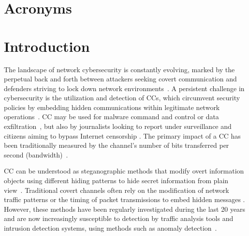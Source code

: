 \documentclass[journal]{IEEEtran}
\begin{document}
\section*{Acronyms}
\begin{acronym}[1200pt]
\setlength{\itemsep}{-3pt}
\end{acronym}

\section{Introduction}
The landscape of network cybersecurity is constantly evolving, marked by the perpetual back and forth between attackers seeking covert communication and defenders striving to lock down network environments~\cite{NIHBook}. A persistent challenge in cybersecurity is the utilization and detection of \ac{CC}s, which circumvent security policies by embedding hidden communications within legitimate network operations~\cite{petitcolas1999information,Schmid23,zander2007survey}. \ac{CC} may be used for malware command and control or data exfiltration~\cite{NIHBook,caviglione2022never,zander2007survey}, but also by journalists looking to report under surveillance \cite{wustrow2011telex,fifield2012evading} and citizens aiming to bypass Internet censorship \cite{AsiaCCS24:OPPR}. The primary impact of a \ac{CC} has been traditionally measured by the channel's number of bits transferred per second (bandwidth)~\cite{twenty02}.

\ac{CC} can be understood as steganographic methods that modify overt information objects using different hiding patterns to hide secret information from plain view~\cite{NIHBook,zander2007survey}. Traditional covert channels often rely on the modification of network traffic patterns or the timing of packet transmissions to embed hidden messages \cite{mileva14,wendzelpatternsurvey15}. However, these methods have been regularly investigated during the last 20 years and are now increasingly susceptible to detection by traffic analysis tools and intrusion detection systems, using methods such as anomaly detection~\cite{detect22}.
\end{document}
